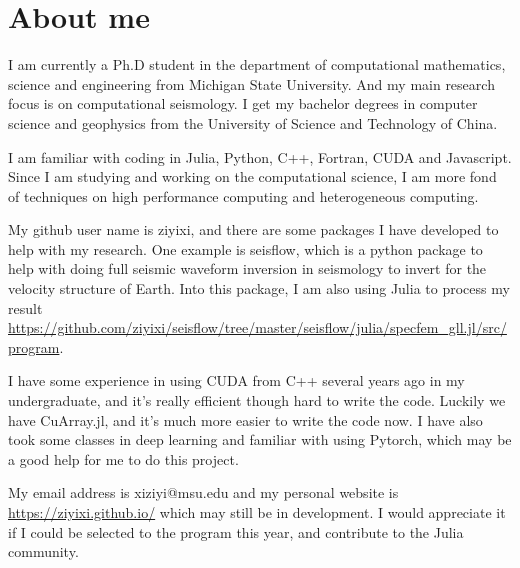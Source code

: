 \documentclass[12pt]{extarticle}
\begin{document}
\section{About me}
I am currently a Ph.D student in the department of computational mathematics, science and engineering from Michigan State University. And my main 
research focus is on computational seismology. I get my bachelor degrees in computer science and geophysics from the University of Science and Technology of
China.

I am familiar with coding in Julia, Python, C++, Fortran, CUDA and Javascript. Since I am studying and working on the computational science, 
I am more fond of techniques on high performance computing and heterogeneous computing.

My github user name is ziyixi, and there are some packages I have developed to help with my research. One example is seisflow, which is a python package 
to help with doing full seismic waveform inversion in seismology to invert for the velocity structure of Earth. Into this package, I am also using
Julia to process my result \url{https://github.com/ziyixi/seisflow/tree/master/seisflow/julia/specfem_gll.jl/src/program}. 

I have some experience in using CUDA from C++ several years ago in my undergraduate, and it's really efficient though hard to write the code. Luckily we have 
CuArray.jl, and it's much more easier to write the code now. I have also took some classes in deep learning and familiar with using Pytorch, which may 
be a good help for me to do this project.

My email address is xiziyi@msu.edu and my personal website is \url{https://ziyixi.github.io/} which may still be in development. I would appreciate it if I 
could be selected to the program this year, and contribute to the Julia community.
\end{document}
